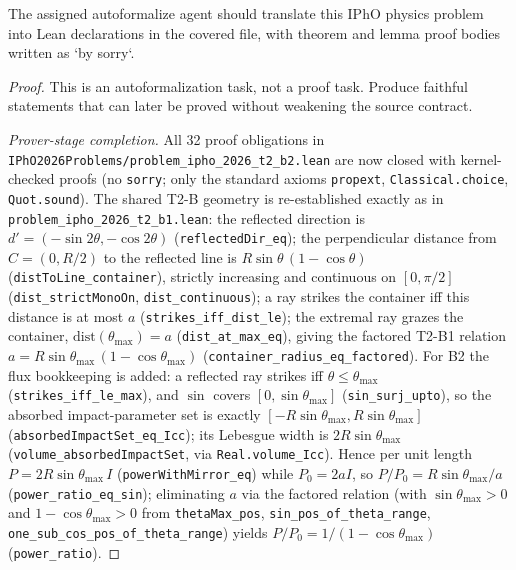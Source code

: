 \begin{theorem}
\label{thm:physics:ipho_2026_t2_b2:target}
\leanok
The assigned autoformalize agent should translate this IPhO physics problem into Lean declarations in the covered file, with theorem and lemma proof bodies written as `by sorry`.
\end{theorem}
\begin{proof}
\leanok
This is an autoformalization task, not a proof task. Produce faithful statements that can later be proved without weakening the source contract.

\emph{Prover-stage completion.} All 32 proof obligations in
\texttt{IPhO2026Problems/problem\_ipho\_2026\_t2\_b2.lean} are now closed with
kernel-checked proofs (no \texttt{sorry}; only the standard axioms
\texttt{propext}, \texttt{Classical.choice}, \texttt{Quot.sound}).  The shared
T2-B geometry is re-established exactly as in
\texttt{problem\_ipho\_2026\_t2\_b1.lean}: the reflected direction is
$d' = (-\sin 2\theta, -\cos 2\theta)$ (\texttt{reflectedDir\_eq}); the
perpendicular distance from $C = (0, R/2)$ to the reflected line is
$R\sin\theta\,(1-\cos\theta)$ (\texttt{distToLine\_container}), strictly
increasing and continuous on $[0, \pi/2]$ (\texttt{dist\_strictMonoOn},
\texttt{dist\_continuous}); a ray strikes the container iff this distance is at
most $a$ (\texttt{strikes\_iff\_dist\_le}); the extremal ray grazes the
container, $\mathrm{dist}(\theta_{\max}) = a$ (\texttt{dist\_at\_max\_eq}),
giving the factored T2-B1 relation
$a = R\sin\theta_{\max}\,(1-\cos\theta_{\max})$
(\texttt{container\_radius\_eq\_factored}).  For B2 the flux bookkeeping is
added: a reflected ray strikes iff $\theta \le \theta_{\max}$
(\texttt{strikes\_iff\_le\_max}), and $\sin$ covers $[0, \sin\theta_{\max}]$
(\texttt{sin\_surj\_upto}), so the absorbed impact-parameter set is exactly
$[-R\sin\theta_{\max}, R\sin\theta_{\max}]$
(\texttt{absorbedImpactSet\_eq\_Icc}); its Lebesgue width is
$2R\sin\theta_{\max}$ (\texttt{volume\_absorbedImpactSet}, via
\texttt{Real.volume\_Icc}).  Hence per unit length
$P = 2R\sin\theta_{\max}\,I$ (\texttt{powerWithMirror\_eq}) while
$P_0 = 2aI$, so $P/P_0 = R\sin\theta_{\max}/a$
(\texttt{power\_ratio\_eq\_sin}); eliminating $a$ via the factored relation
(with $\sin\theta_{\max} > 0$ and $1-\cos\theta_{\max} > 0$ from
\texttt{thetaMax\_pos}, \texttt{sin\_pos\_of\_theta\_range},
\texttt{one\_sub\_cos\_pos\_of\_theta\_range}) yields
$P/P_0 = 1/(1-\cos\theta_{\max})$ (\texttt{power\_ratio}).
\end{proof}
